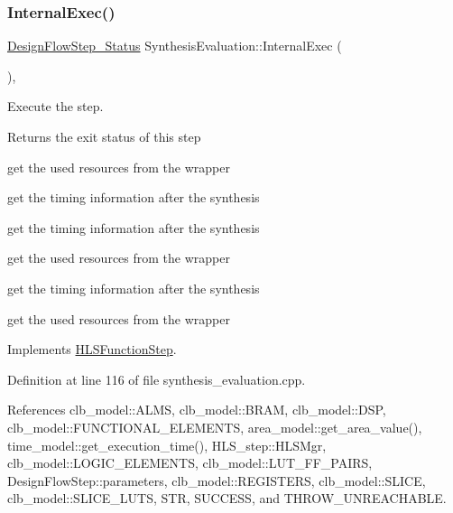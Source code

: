 \mbox{\label{classSynthesisEvaluation_a0086eea12b3721703d95d0031ed54257}} 
\subsubsection{\texorpdfstring{Internal\+Exec()}{InternalExec()}}
{\footnotesize\ttfamily \hyperlink{design__flow__step_8hpp_afb1f0d73069c26076b8d31dbc8ebecdf}{Design\+Flow\+Step\+\_\+\+Status} Synthesis\+Evaluation\+::\+Internal\+Exec (\begin{DoxyParamCaption}{ }\end{DoxyParamCaption})\hspace{0.3cm}{\ttfamily [override]}, {\ttfamily [virtual]}}



Execute the step. 

\begin{DoxyReturn}{Returns}
the exit status of this step 
\end{DoxyReturn}
get the used resources from the wrapper

get the timing information after the synthesis

get the timing information after the synthesis

get the used resources from the wrapper

get the timing information after the synthesis

get the used resources from the wrapper 

Implements \hyperlink{classHLSFunctionStep_a8db4c00d080655984d98143206fc9fa8}{H\+L\+S\+Function\+Step}.



Definition at line 116 of file synthesis\+\_\+evaluation.\+cpp.



References clb\+\_\+model\+::\+A\+L\+MS, clb\+\_\+model\+::\+B\+R\+AM, clb\+\_\+model\+::\+D\+SP, clb\+\_\+model\+::\+F\+U\+N\+C\+T\+I\+O\+N\+A\+L\+\_\+\+E\+L\+E\+M\+E\+N\+TS, area\+\_\+model\+::get\+\_\+area\+\_\+value(), time\+\_\+model\+::get\+\_\+execution\+\_\+time(), H\+L\+S\+\_\+step\+::\+H\+L\+S\+Mgr, clb\+\_\+model\+::\+L\+O\+G\+I\+C\+\_\+\+E\+L\+E\+M\+E\+N\+TS, clb\+\_\+model\+::\+L\+U\+T\+\_\+\+F\+F\+\_\+\+P\+A\+I\+RS, Design\+Flow\+Step\+::parameters, clb\+\_\+model\+::\+R\+E\+G\+I\+S\+T\+E\+RS, clb\+\_\+model\+::\+S\+L\+I\+CE, clb\+\_\+model\+::\+S\+L\+I\+C\+E\+\_\+\+L\+U\+TS, S\+TR, S\+U\+C\+C\+E\+SS, and T\+H\+R\+O\+W\+\_\+\+U\+N\+R\+E\+A\+C\+H\+A\+B\+LE.

